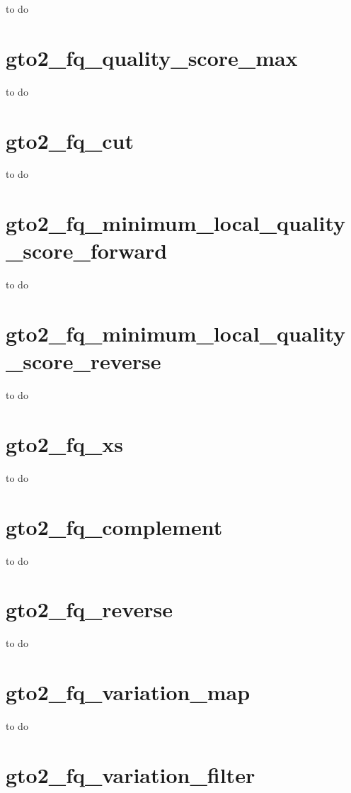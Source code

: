 \documentclass[11pt,]{krantz}
\begin{document}
to do

\section{gto2\_fq\_quality\_score\_max}\label{gto2_fq_quality_score_max}

to do

\section{gto2\_fq\_cut}\label{gto2_fq_cut}

to do

\section{gto2\_fq\_minimum\_local\_quality\_score\_forward}\label{gto2_fq_minimum_local_quality_score_forward}

to do

\section{gto2\_fq\_minimum\_local\_quality\_score\_reverse}\label{gto2_fq_minimum_local_quality_score_reverse}

to do

\section{gto2\_fq\_xs}\label{gto2_fq_xs}

to do

\section{gto2\_fq\_complement}\label{gto2_fq_complement}

to do

\section{gto2\_fq\_reverse}\label{gto2_fq_reverse}

to do

\section{gto2\_fq\_variation\_map}\label{gto2_fq_variation_map}

to do

\section{gto2\_fq\_variation\_filter}\label{gto2_fq_variation_filter}
\end{document}
